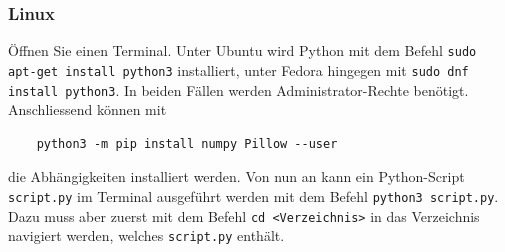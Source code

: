 \documentclass[12pt,a4paper]{article}
\theoremstyle{definition}
\theoremstyle{definition}
\begin{document}
\subsubsection*{Linux}
Öffnen Sie einen Terminal.
Unter Ubuntu wird Python mit dem Befehl \texttt{sudo apt-get install python3} installiert, unter Fedora hingegen mit \texttt{sudo dnf install python3}.
In beiden Fällen werden Administrator-Rechte benötigt.
Anschliessend können mit
\begin{verbatim}
	python3 -m pip install numpy Pillow --user
\end{verbatim}
die Abhängigkeiten installiert werden.
Von nun an kann ein Python-Script \texttt{script.py} im Terminal ausgeführt werden mit dem Befehl \texttt{python3 script.py}.
Dazu muss aber zuerst mit dem Befehl \texttt{cd <Verzeichnis>} in das Verzeichnis navigiert werden, welches \texttt{script.py} enthält.
\end{document}
